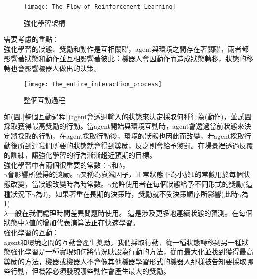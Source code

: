 \begin{figure}[hbt!]
\begin{center}
\texttt{[image: The\_Flow\_of\_Reinforcement\_Learning]}
\caption{\Large 強化學習架構}
\label{RL structur}
\end{center}
\end{figure}
需要考慮的重點：\\
強化學習的狀態、獎勵和動作是互相關聯，agent與環境之間存在著關聯，兩者都影響著狀態和動作並互相影響著彼此：機器人會因動作而造成狀態轉移，狀態的移轉也會影響機器人做出的決策。\\
\newpage
\begin{figure}[hbt!]
\begin{center}
\texttt{[image: The\_entire\_interaction\_process]}
\caption{\Large 整個互動過程}
\label{整個互動過程 }
\end{center}
\end{figure}
 如(圖.\ref{整個互動過程})agent會透過輸入的狀態來決定採取何種行為(動作)，並試圖採取獲得最高獎勵的行動。當agent開始與環境互動時，agent會透過當前狀態來決定將採取的行動，在agent採取行動後，環境的狀態也因此而改變，若agent採取行動後所到達我們所要的狀態就會得到獎勵，反之則會給予懲罰。在場景裡透過反覆的訓練，讓強化學習的行為漸漸趨近預期的目標。\\
 強化學習中有兩個很重要的常數：$\gamma$和$\lambda$。\\
 $\gamma$會影響所獲得的獎勵。$\gamma$又稱為衰減因子，正常狀態下為小於1的常數用於每個狀態改變，當狀態改變時為時常數。$\gamma$允許使用者在每個狀態給予不同形式的獎勵(這種狀況下$\gamma$為0)，如果著重在長期的決策時，獎勵就不受決策順序所影響(此時$\gamma$為1)\\

$\lambda$一般在我們處理時間差異問題時使用。 這是涉及更多地連續狀態的預測。在每個狀態中$\lambda$值的增加代表演算法正在快速學習。\\
\iffalse
\begin{figure}[hbt!]
\begin{center}
\texttt{[image:  Reinforcement\_Learning\_interactions]}
\caption{\Large Reinforcement Learning interactions}
\end{center}
\end{figure}
\fi
強化學習的互動：\\
 agent和環境之間的互動會產生獎勵，我們採取行動，從一種狀態轉移到另一種狀態強化學習是一種實現如何將情況映設為行動的方法，從而最大化並找到獲得最高獎勵的方法，機器或機器人不會像其他機器學習形式的機器人那樣被告知要採取哪些行動，但機器必須發現哪些動作會產生最大的獎勵。\\
 
